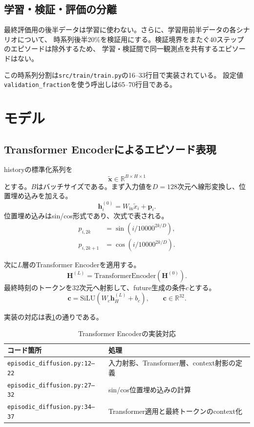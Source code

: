 \documentclass[a4paper,11pt]{bxjsarticle}
\begin{document}
\subsection{学習・検証・評価の分離}
最終評価用の後半データは学習に使わない。さらに、学習用前半データの各シナリオについて、
時系列後半20\%を検証用にする。検証境界をまたぐ40ステップのエピソードは除外するため、
学習・検証間で同一観測点を共有するエピソードはない。

この時系列分割は\texttt{src/train/train.py}の16--33行目で実装されている。
設定値\texttt{validation\_fraction}を使う呼出しは65--70行目である。

\section{モデル}
\subsection{Transformer Encoderによるエピソード表現}
historyの標準化系列を
\begin{equation}
  \tilde{\mathbf{x}} \in \mathbb{R}^{B\times H\times 1}
\end{equation}
とする。$B$はバッチサイズである。まず入力値を$D=128$次元へ線形変換し、位置埋め込みを加える。
\begin{equation}
  \mathbf{h}^{(0)}_i = W_{\mathrm{in}}\tilde{x}_i + \mathbf{p}_i.
\end{equation}
位置埋め込みはsin/cos形式であり、次式で表される。
\begin{align}
  p_{i,2k} &= \sin\left(i / 10000^{2k/D}\right), \\
  p_{i,2k+1} &= \cos\left(i / 10000^{2k/D}\right).
\end{align}

次に$L$層のTransformer Encoderを適用する。
\begin{equation}
  \mathbf{H}^{(L)} = \mathrm{TransformerEncoder}(\mathbf{H}^{(0)}).
\end{equation}
最終時刻のトークンを32次元へ射影して、future生成の条件$c$とする。
\begin{equation}
  \mathbf{c}=\mathrm{SiLU}(W_c\mathbf{h}^{(L)}_{H}+b_c),
  \qquad \mathbf{c}\in\mathbb{R}^{32}.
\end{equation}

実装の対応は表\ref{tab:encoder}の通りである。
\begin{table}[htbp]
\centering
\caption{Transformer Encoderの実装対応}
\label{tab:encoder}
\begin{tabular}{ll}
\toprule
コード箇所 & 処理 \\
\midrule
\texttt{episodic\_diffusion.py:12--22} & 入力射影、Transformer層、context射影の定義 \\
\texttt{episodic\_diffusion.py:27--32} & sin/cos位置埋め込みの計算 \\
\texttt{episodic\_diffusion.py:34--37} & Transformer適用と最終トークンのcontext化 \\
\bottomrule
\end{tabular}
\end{table}
\end{document}
